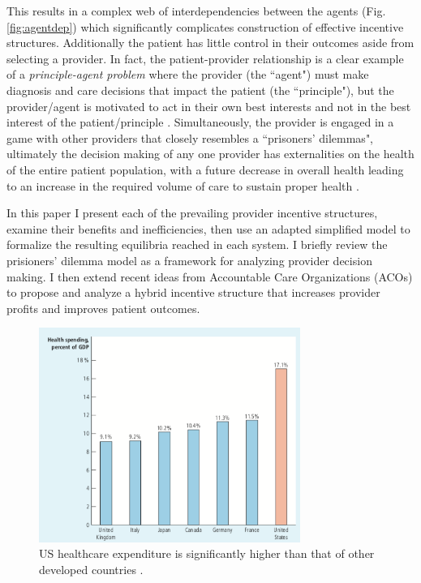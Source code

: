 \documentclass{article}
\begin{document}
This results in a complex web of interdependencies between the agents (Fig. \ref{fig:agentdep}) which significantly complicates construction of effective incentive structures. Additionally the patient has little control in their outcomes aside from selecting a provider. In fact, the patient-provider relationship is a clear example of a \emph{principle-agent problem} \cite{principle} where the provider (the ``agent") must make diagnosis and care decisions that impact the patient (the ``principle"), but the provider/agent is motivated to act in their own best interests and not in the best interest of the patient/principle \cite{msdt}. Simultaneously, the provider is engaged in a game with other providers that closely resembles a ``prisoners' dilemmas", ultimately the decision making of any one provider has externalities on the health of the entire patient population, with a future decrease in overall health leading to an increase in the required volume of care to sustain proper health \cite{blended}.

In this paper I present each of the prevailing provider incentive structures, examine their benefits and inefficiencies, then use an adapted simplified model to formalize the resulting equilibria reached in each system. I briefly review the prisioners' dilemma model as a framework for analyzing provider decision making. I then extend recent ideas from Accountable Care Organizations (ACOs) to propose and analyze a hybrid incentive structure that increases provider profits and improves patient outcomes.

\begin{figure}[H]
\includegraphics[height=7cm]{usspend}
\centering
\caption{US healthcare expenditure is significantly higher than that of other developed countries \cite{econharvard}.}
\label{fig:usspend}
\end{figure}
\end{document}
